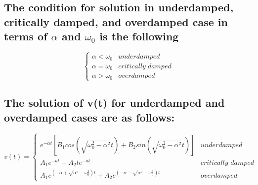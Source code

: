 \documentclass{article}
\begin{document}
\subsection{The condition for solution in underdamped, critically damped, and overdamped case in terms of $\alpha$ and $\omega_0$ is the following}
\[ \begin{cases} 
      \alpha < \omega_0 & underdamped \\
      \alpha = \omega_0 & critically\; damped \\
      \alpha > \omega_0 & overdamped 
   \end{cases}
\]
\subsection{The solution of v(t) for underdamped and overdamped cases are as follows:}
\[ 
v(t)=
    \begin{cases} 
        e^{-\alpha t}[B_1cos(\sqrt{\omega_0^2-\alpha^2}t)+B_2sin(\sqrt{\omega_0^2-\alpha^2}t)] & underdamped \\
        A_1e^{-at}+A_2te^{-at} & \textit{critically damped}\\
        A_1e^{(-\alpha+\sqrt{\alpha^2-\omega_0^2})t} + A_2e^{(-\alpha-\sqrt{\alpha^2-\omega_0^2})t} & overdamped 
    \end{cases}
\]
\end{document}
